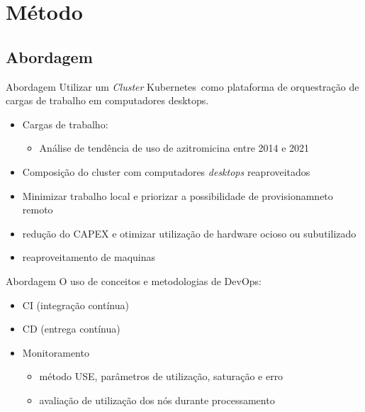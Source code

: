 \documentclass[10pt,brazil]{beamer}
\theoremstyle{definition}
\begin{document}
\section{Método}

\subsection{Abordagem}
\begin{frame}[allowframebreaks]{Abordagem}
  Utilizar um \emph{Cluster} Kubernetes\textregistered\ como plataforma de orquestração de cargas de trabalho em computadores desktops.
  \begin{itemize}
    \item Cargas de trabalho:
          \begin{itemize}
            \item Análise de tendência de uso de azitromicina entre 2014 e 2021
          \end{itemize}
        \item Composição do cluster com computadores \emph{desktops} reaproveitados
        \item Minimizar trabalho local e priorizar a possibilidade de provisionamneto remoto
        \item redução do CAPEX e otimizar utilização de hardware ocioso ou subutilizado
        \item reaproveitamento de maquinas
    \end{itemize}
\end{frame}

\begin{frame}{Abordagem}
  O uso de conceitos e metodologias de DevOps:
  \begin{itemize}
            \item CI (integração contínua) 
            \item CD (entrega contínua)
    \item Monitoramento
        \begin{itemize}
            \item método USE, parâmetros de utilização, saturação e erro 
            \item avaliação de utilização dos nós durante processamento
        \end{itemize}
  \end{itemize}
\end{frame}

\end{document}
